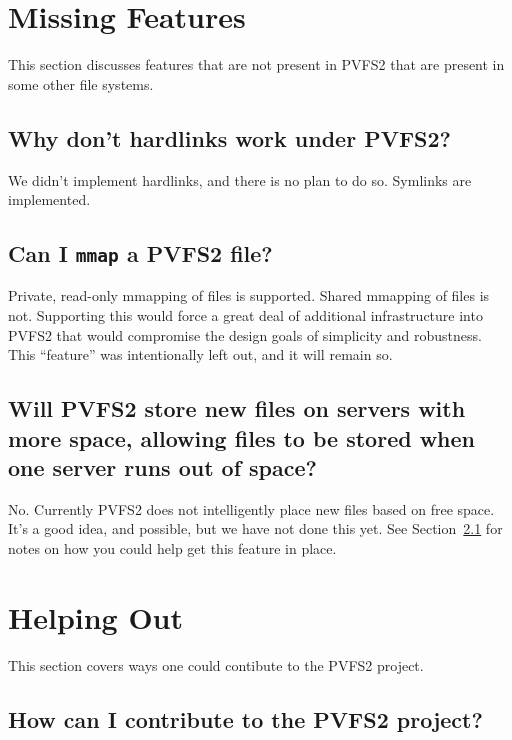 \documentclass[11pt,letterpaper]{article}
\begin{document}
%
%
\section{Missing Features}

This section discusses features that are not present in PVFS2 that are present
in some other file systems.

\subsection{Why don't hardlinks work under PVFS2?}

We didn't implement hardlinks, and there is no plan to do so.  Symlinks are
implemented.

\subsection{Can I \texttt{mmap} a PVFS2 file?}

Private, read-only mmapping of files is supported.  Shared mmapping of files
is not.  Supporting this would force a great deal of additional infrastructure
into PVFS2 that would compromise the design goals of simplicity and
robustness.  This ``feature'' was intentionally left out, and it will remain
so.

\subsection{Will PVFS2 store new files on servers with more space, allowing
            files to be stored when one server runs out of space?}

No.  Currently PVFS2 does not intelligently place new files based on free
space.  It's a good idea, and possible, but we have not done this yet.  See
Section~\ref{sec:contributing} for notes on how you could help get this
feature in place.

%
%
\section{Helping Out}

This section covers ways one could contibute to the PVFS2 project.

\subsection{How can I contribute to the PVFS2 project?}
\label{sec:contributing}
\end{document}
